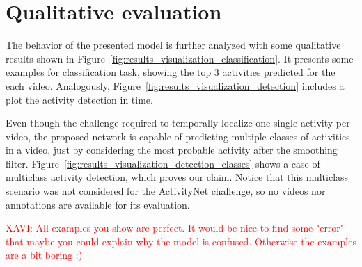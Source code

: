 \section{Qualitative evaluation}

The behavior of the presented model is further analyzed with some qualitative results shown in Figure~\ref{fig:results_visualization_classification}. It presents some examples for classification task, showing the top 3 activities predicted for the each video. Analogously, Figure~\ref{fig:results_visualization_detection} includes a plot the activity detection in time.

Even though the challenge required to temporally localize one single activity per video, the proposed network is capable of predicting multiple classes of activities in a video, just by considering the most probable activity after the smoothing filter.
Figure~\ref{fig:results_visualization_detection_classes} shows a case of multiclass activity detection, which proves our claim.
Notice that this multiclass scenario was not considered for the ActivityNet challenge, so no videos nor annotations are available for its evaluation.

\textcolor{red}{XAVI: All examples you show are perfect. It would be nice to find some "error" that maybe you could explain why the model is confused. Otherwise the examples are a bit boring :)}

